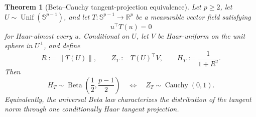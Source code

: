 \documentclass[11pt]{article}
\numberwithin{equation}{section}
\theoremstyle{thmstyleone}%
\newtheorem{theorem}{Theorem}[section]
\theoremstyle{thmstyletwo}%
\newcommand{\R}{\mathbb R}
\newcommand{\sphere}{\mathbb S}
\newcommand{\Beta}{\operatorname{Beta}}
\newcommand{\Cauchy}{\operatorname{Cauchy}}
\newcommand{\Unif}{\operatorname{Unif}}
\begin{document}
\begin{theorem}[Beta--Cauchy tangent-projection equivalence]
\label{thm:tangent-projection-equivalence}
Let \(p\geq2\), let \(U\sim\Unif(\sphere^{p-1})\), and let
\(T:\sphere^{p-1}\to\R^p\) be a measurable vector field satisfying
\[
  u^\top T(u)=0
\]
for Haar-almost every \(u\).  Conditional on \(U\), let \(V\) be
Haar-uniform on the unit sphere in \(U^\perp\), and define
\begin{equation}
  R:=\|T(U)\|,
  \qquad
  Z_T:=T(U)^\top V,
  \qquad
  H_T:=\frac{1}{1+R^2}.
  \label{eq:general-tangent-variables}
\end{equation}
Then
\begin{equation}
  H_T\sim\Beta\!\left(\frac12,\frac{p-1}{2}\right)
  \quad\Longleftrightarrow\quad
  Z_T\sim\Cauchy(0,1).
  \label{eq:beta-cauchy-equivalence}
\end{equation}
Equivalently, the universal Beta law characterizes the distribution of the
tangent norm through one conditionally Haar tangent projection.
\end{theorem}
\end{document}
